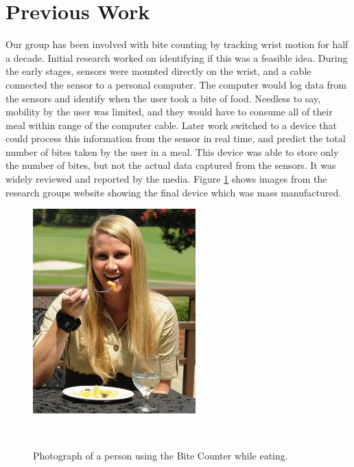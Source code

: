 \section{Previous Work}
Our group has been involved with bite counting by tracking wrist motion for half a decade.
Initial research \cite{dong2012new} worked on identifying if this was a feasible idea.
During the early stages,
sensors were mounted directly on the wrist,
and a cable connected the sensor to a personal computer.
The computer would log data from the sensors and identify when the user took a bite of food.
Needless to say,
mobility by the user was limited,
and they would have to consume all of their meal within range of the computer cable.
Later work switched to a device that could process this information from the sensor in real time,
and predict the total number of bites taken by the user in a meal.
This device was able to store only the number of bites, 
but not the actual data captured from the sensors.
It was widely reviewed and reported by the media.
Figure \ref{Fig:BCEater} shows images from the research groups website showing the final device which was mass manufactured.

\begin{figure}
        \centering
                \includegraphics[]{images/BCEater.JPG}

                \label{fig:gull}
        ~ %
         \caption{Photograph of a person using the Bite Counter while eating.}\label{Fig:BCEater}
\end{figure}

